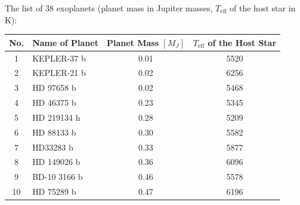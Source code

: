 \begin{description}
\end{description}

\medskip
\noindent The list of 38 exoplanets (planet mass in Jupiter masses,
$T_{\mathrm{eff}}$ of the host star in K):

\begin{center}
\begin{tabular}{clcc}
\toprule
No. & Name of Planet & Planet Mass $[M_J]$ & $T_{\mathrm{eff}}$ of the Host Star\\
\midrule
1 & KEPLER-37 b & 0.01 & 5520\\
2 & KEPLER-21 b & 0.02 & 6256\\
3 & HD 97658 b  & 0.02 & 5468\\
4 & HD 46375 b  & 0.23 & 5345\\
5 & HD 219134 h & 0.28 & 5209\\
6 & HD 88133 b  & 0.30 & 5582\\
7 & HD33283 b   & 0.33 & 5877\\
8 & HD 149026 b & 0.36 & 6096\\
9 & BD-10 3166 b & 0.46 & 5578\\
10 & HD 75289 b & 0.47 & 6196\\
\bottomrule
\end{tabular}
\end{center}


